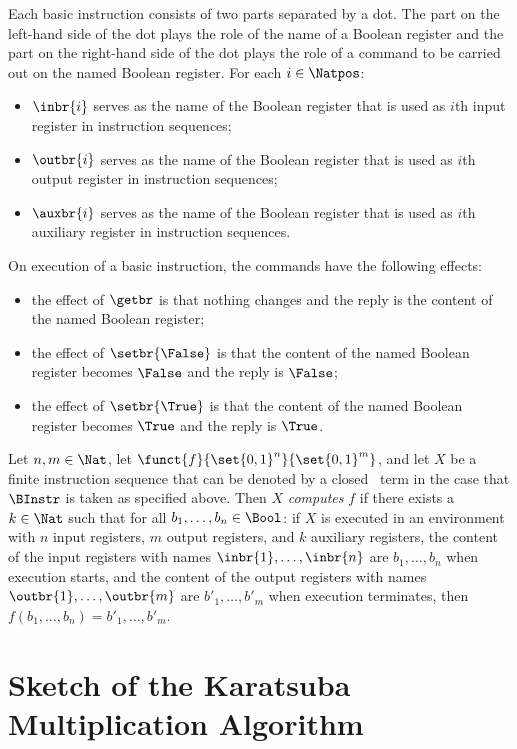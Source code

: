 \documentclass{llncs}
\begin{document}
Each basic instruction consists of two parts separated by a dot.
The part on the left-hand side of the dot plays the role of the name of 
a Boolean register and the part on the right-hand side of the dot plays 
the role of a command to be carried out on the named Boolean register.
For each $i \in \Natpos$:
\begin{itemize}
\item
$\inbr{i}$ serves as the name of the Boolean register that is used as 
$i$th input register in instruction sequences;
\item
$\outbr{i}$ serves as the name of the Boolean register that is used as
$i$th output register in instruction sequences;
\item
$\auxbr{i}$ serves as the name of the Boolean register that is used as 
$i$th auxiliary register in instruction sequences.
\end{itemize}
On execution of a basic instruction, the commands have the following 
effects:
\begin{itemize}
\item
the effect of $\getbr$ is that nothing changes and the reply is the 
content of the named Boolean register;
\item
the effect of $\setbr{\False}$ is that the content of the named Boolean 
register becomes $\False$ and the reply is $\False$;
\item
the effect of $\setbr{\True}$ is that the content of the named Boolean 
register becomes $\True$ and the reply is $\True$.
\end{itemize}

Let $n,m \in \Nat$, let $\funct{f}{\set{0,1}^n}{\set{0,1}^m}$, and let
$X$ be a finite instruction sequence that can be denoted by a closed 
\PGA\ term in the case that $\BInstr$ is taken as specified above.
Then $X$ \emph{computes} $f$ if there exists a $k \in \Nat$ such that 
for all $b_1,\ldots,b_n \in \Bool$: if $X$ is executed in an environment 
with $n$ input registers, $m$ output registers, and $k$ auxiliary 
registers, the content of the input registers with names 
$\inbr{1},\ldots,\inbr{n}$ are $b_1,\ldots,b_n$ when execution starts, 
and the content of the output registers with names 
$\outbr{1},\ldots,\outbr{m}$ are $b'_1,\ldots,b'_m$ when execution 
terminates, then $f(b_1,\ldots,b_n) = b'_1,\ldots,b'_m$.

\section{Sketch of the Karatsuba Multiplication Algorithm}
\label{sect-sketch-KMA}
\end{document}
